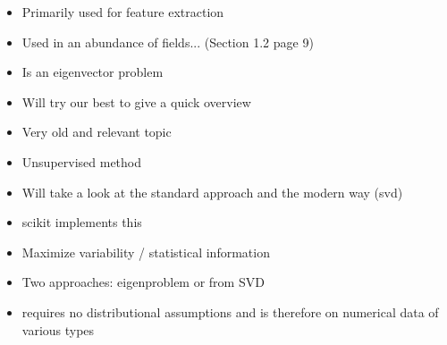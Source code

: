 \begin{itemize}
	\item Primarily used for feature extraction \cite{PythonMachineLearningCh5}
	\item Used in an abundance of fields... \cite{Jolliffe2002book} (Section 1.2 page 9)
	\item Is an eigenvector problem \cite{MultilinearSubspaceLearningCh2}
	\item Will try our best to give a quick overview
	\item Very old and relevant topic
	\item Unsupervised method \cite{PythonMachineLearningCh5}
	\item Will take a look at the standard approach and the modern way (svd)
	\item scikit implements this \cite{tipping1999mixtures}
	\item Maximize variability / statistical information \cite{jolliffe2016principal}
	\item Two approaches: eigenproblem or from SVD \cite{jolliffe2016principal}
	\item requires no distributional assumptions and is therefore on numerical data of various types \cite{jolliffe2016principal}
\end{itemize}








